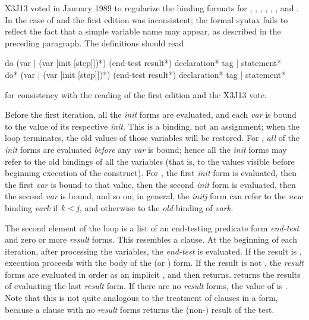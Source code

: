 \begin{defmac}
\begin{new}
X3J13 voted in January 1989
to regularize the binding formats for , , ,
, , , and .
In the case of  and  the first edition was inconsistent;
the formal syntax fails to reflect the fact that a simple variable
name may appear, as described in the preceding paragraph.  The
definitions should read

\begin{defmac}
do ({var | (var [init [step]])}*)
   (end-test {result}*)
   {declaration}* {tag | statement}* \\
do* ({var | (var [init [step]])}*)
    (end-test {result}*)
    {declaration}* {tag | statement}*

for consistency with the reading of the first edition and the X3J13 vote.
\end{defmac}
\end{new}

Before the first iteration, all the \emph{init} forms are evaluated, and
each \emph{var} is bound to the value of its respective \emph{init}.
This is a binding, not an assignment; when the loop terminates,
the old values of those variables will be restored.
For , \emph{all} of the \emph{init} forms are evaluated \emph{before} any \emph{var}
is bound; hence all the
\emph{init} forms may refer to the old bindings of all the variables
(that is, to the values visible before beginning execution of
the  construct).
For , the first \emph{init} form is evaluated, then the first
\emph{var} is bound to that value, then the second \emph{init} form
is evaluated, then the second \emph{var} is bound, and so on;
in general, the \emph{initj} form can refer to the \emph{new} binding \emph{vark}
if $\emph{k\/}<\emph{j}$, and otherwise to the \emph{old} binding of \emph{vark}.

The second element of the loop is a list of an end-testing
predicate form \emph{end-test} and zero or more \emph{result} forms.
This resembles a  clause.
At the beginning of each iteration, after processing the variables,
the \emph{end-test} is evaluated.  If the result is
{\false}, execution proceeds with the body of the  (or ) form.
If the
result is not {\false}, the \emph{result} forms are evaluated in order
as an implicit ,
and then  returns.   returns the results of evaluating
the last \emph{result} form.
If there are no \emph{result} forms, the value of  is {\false}.
Note that this is not quite analogous to the treatment of
clauses in a  form, because a  clause
with no \emph{result} forms returns the (non-{\nil}) result of the test.


\end{defmac}
